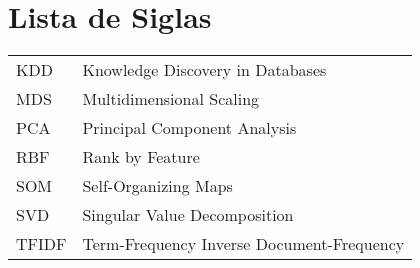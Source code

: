 \chapter*{Lista de Siglas}

\begin{tabular}{l l}
    KDD  & Knowledge Discovery in Databases\\
    MDS  & Multidimensional Scaling\\
    PCA  & Principal Component Analysis\\
    RBF  & Rank by Feature \\
    SOM  & Self-Organizing Maps\\
    SVD  & Singular Value Decomposition\\
    TFIDF & Term-Frequency Inverse Document-Frequency\\
\end{tabular}
